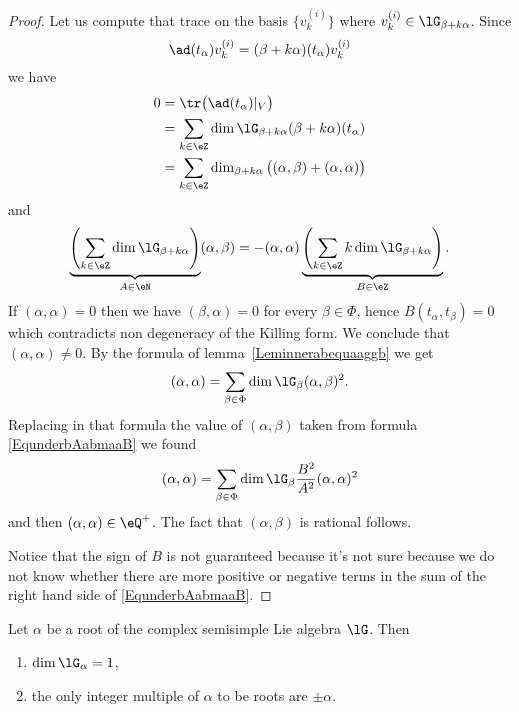 \begin{proof}
    Let us compute that trace on the basis \( \{ v_k^{(i)} \}\) where \( v_k^{(i)}\in\lG_{\beta+k\alpha}\). Since
    \begin{equation}
        \ad(t_{\alpha})v_k^{(i)}=(\beta+k\alpha)(t_{\alpha})v_k^{(i)}
    \end{equation}
    we have
    \begin{subequations}
        \begin{align}
            0&=\tr\big( \ad(t_{\alpha})|_V \big)\\
            &=\sum_{k\in\eZ}\dim\lG_{\beta+k\alpha}(\beta+k\alpha)(t_{\alpha})\\
            &=\sum_{k\in\eZ}\dim_{\beta+k\alpha}\big( (\alpha,\beta)+(\alpha,\alpha) \big)
        \end{align}
    \end{subequations}
    and
    \begin{equation}        \label{EqunderbAabmaaB}
        \underbrace{\left( \sum_{k\in\eZ}\dim\lG_{\beta+k\alpha} \right)}_{A\in\eN}(\alpha,\beta)=-(\alpha,\alpha)\underbrace{\left( \sum_{k\in\eZ}k\dim\lG_{\beta+k\alpha} \right)}_{B\in\eZ}.
    \end{equation}
    If \( (\alpha,\alpha)=0\) then we have \( (\beta,\alpha)=0\) for every \( \beta\in\Phi\), hence \( B(t_{\alpha},t_{\beta})=0\) which contradicts non degeneracy of the Killing form. We conclude that \( (\alpha,\alpha)\neq 0\). By the formula of lemma~\ref{Leminnerabequaaggb} we get
    \begin{equation}
        (\alpha,\alpha)=\sum_{\beta\in\Phi}\dim\lG_{\beta}(\alpha,\beta)^2.
    \end{equation}
    Replacing in that formula the value of \( (\alpha,\beta)\) taken from formula \eqref{EqunderbAabmaaB} we found
    \begin{equation}
        (\alpha,\alpha)=\sum_{\beta\in\Phi}\dim\lG_{\beta}\frac{ B^2 }{ A^2 }(\alpha,\alpha)^2
    \end{equation}
    and then \( (\alpha,\alpha)\in\eQ^+\). The fact that \( (\alpha,\beta)\) is rational follows.

    Notice that the sign of \( B\) is not guaranteed because it's not sure because we do not know whether there are more positive or negative terms in the sum of the right hand side of \eqref{EqunderbAabmaaB}.
\end{proof}

\begin{proposition}
    Let \( \alpha\) be a root of the complex semisimple Lie algebra \( \lG\). Then
    \begin{enumerate}
        \item
            \( \dim\lG_{\alpha}=1\),
        \item
            the only integer multiple of \( \alpha\) to be roots are \( \pm\alpha\).
    \end{enumerate}
\end{proposition}

